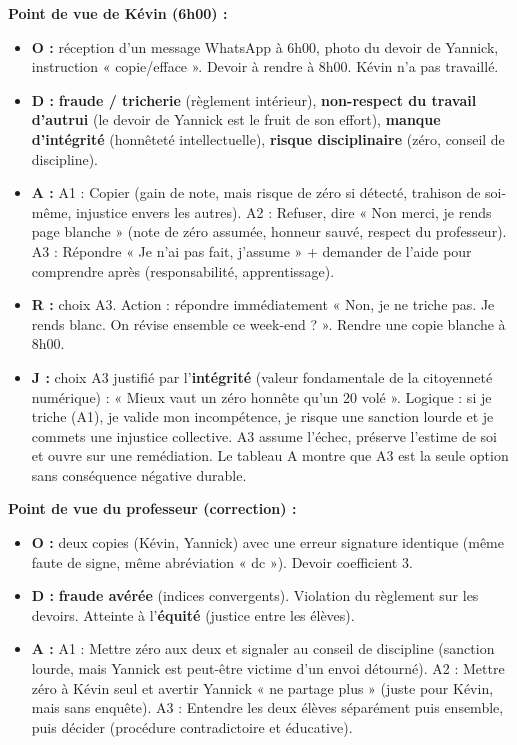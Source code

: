\documentclass[11pt]{article}
\begin{document}
\begin{corrige}
\textbf{Point de vue de Kévin (6h00) :}
\begin{itemize}
    \item \textbf{O :} réception d'un message WhatsApp à 6h00, photo du devoir de Yannick, instruction « copie/efface ». Devoir à rendre à 8h00. Kévin n'a pas travaillé.
    \item \textbf{D :} \textbf{fraude / tricherie} (règlement intérieur), \textbf{non-respect du travail d'autrui} (le devoir de Yannick est le fruit de son effort), \textbf{manque d'intégrité} (honnêteté intellectuelle), \textbf{risque disciplinaire} (zéro, conseil de discipline).
    \item \textbf{A :} A1 : Copier (gain de note, mais risque de zéro si détecté, trahison de soi-même, injustice envers les autres). A2 : Refuser, dire « Non merci, je rends page blanche » (note de zéro assumée, honneur sauvé, respect du professeur). A3 : Répondre « Je n'ai pas fait, j'assume » + demander de l'aide pour comprendre après (responsabilité, apprentissage).
    \item \textbf{R :} choix A3. Action : répondre immédiatement « Non, je ne triche pas. Je rends blanc. On révise ensemble ce week-end ? ». Rendre une copie blanche à 8h00.
    \item \textbf{J :} choix A3 justifié par l'\textbf{intégrité} (valeur fondamentale de la citoyenneté numérique) : « Mieux vaut un zéro honnête qu'un 20 volé ». Logique : si je triche (A1), je valide mon incompétence, je risque une sanction lourde et je commets une injustice collective. A3 assume l'échec, préserve l'estime de soi et ouvre sur une remédiation. Le tableau A montre que A3 est la seule option sans conséquence négative durable.
\end{itemize}
\textbf{Point de vue du professeur (correction) :}
\begin{itemize}
    \item \textbf{O :} deux copies (Kévin, Yannick) avec une erreur signature identique (même faute de signe, même abréviation « dc »). Devoir coefficient 3.
    \item \textbf{D :} \textbf{fraude avérée} (indices convergents). Violation du règlement sur les devoirs. Atteinte à l'\textbf{équité} (justice entre les élèves).
    \item \textbf{A :} A1 : Mettre zéro aux deux et signaler au conseil de discipline (sanction lourde, mais Yannick est peut-être victime d'un envoi détourné). A2 : Mettre zéro à Kévin seul et avertir Yannick « ne partage plus » (juste pour Kévin, mais sans enquête). A3 : Entendre les deux élèves séparément puis ensemble, puis décider (procédure contradictoire et éducative).

\end{itemize}
\end{corrige}
\end{document}

